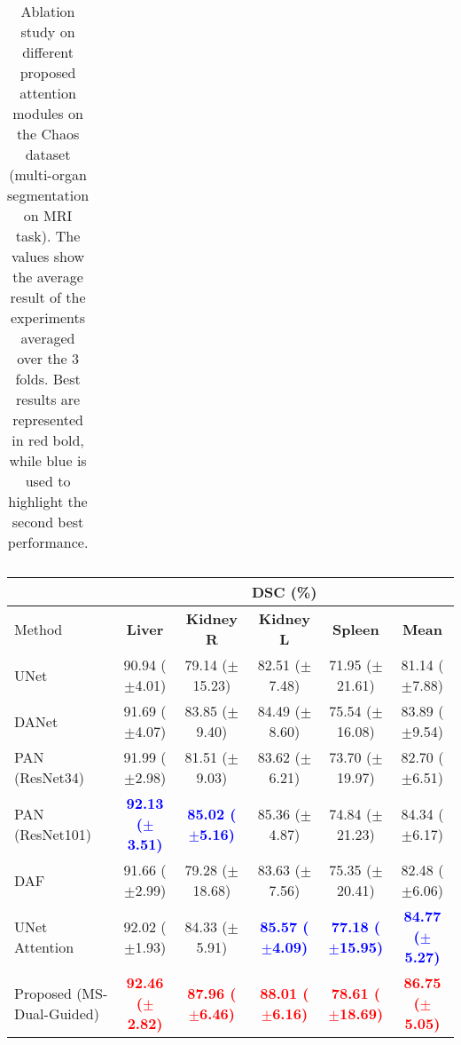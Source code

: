 \documentclass[journal]{IEEEtran}
\begin{document}
\begin{table*}[ht!]
\begin{tabular}{lcccc|c}
\midrule
\end{tabular}
\caption{Ablation study on different proposed attention modules on the Chaos dataset (multi-organ segmentation on MRI task). The values show the average result of the experiments averaged over the 3 folds. Best results are represented in red bold, while blue is used to highlight the second best performance.}
\label{table:metrics_ablation_supplemental}
\end{table*}

\begin{table*}[t!]
\centering
\scriptsize
\begin{tabular}{lcccc|c}\\
\toprule
 & \multicolumn{5}{c}{\textbf{DSC} (\%)}\\
 \midrule
Method & \textbf{Liver} & \textbf{Kidney R} & \textbf{Kidney L} & \textbf{Spleen} & \textbf{Mean}  \\
 \midrule
UNet \cite{ronneberger2015u}  & 90.94 ($\pm$4.01)  & 79.14 ($\pm$15.23) & 82.51 ($\pm$7.48) & 71.95 ($\pm$21.61) &  81.14 ($\pm$7.88) \\
DANet \cite{fu2018dual}  & 91.69  ($\pm$4.07) & 83.85 ($\pm$9.40)& 84.49 ($\pm$8.60) & 75.54 ($\pm$16.08)&  83.89 ($\pm$9.54)   \\
PAN (ResNet34) \cite{li2018pyramid}   & 91.99 ($\pm$2.98)  & 81.51 ($\pm$9.03) & 83.62 ($\pm$6.21) & 73.70 ($\pm$19.97) & 82.70 ($\pm$6.51) \\
PAN (ResNet101)\cite{li2018pyramid}   & \textcolor{blue}{\textbf{92.13 ($\pm$3.51)}}  & \textcolor{blue}{\textbf{85.02 ($\pm$5.16)}} & 85.36 ($\pm$4.87) & 74.84 ($\pm$21.23) & 84.34 ($\pm$6.17) \\
DAF \cite{wang18d}  &  91.66 ($\pm$2.99) & 79.28 ($\pm$18.68)& 83.63 ($\pm$7.56) &  75.35 ($\pm$20.41)&  82.48 ($\pm$6.06)   \\
UNet Attention \cite{schlemper2019attention}  &   92.02 ($\pm$1.93) & 84.33 ($\pm$5.91)&  \textcolor{blue}{\textbf{85.57 ($\pm$4.09)}} & \textcolor{blue}{\textbf{77.18 ($\pm$15.95)}} &  \textcolor{blue}{\textbf{84.77 ($\pm$5.27)}}   \\
Proposed (MS-Dual-Guided)  & \textcolor{red}{\textbf{92.46 ($\pm$2.82)}}  & \textcolor{red}{\textbf{87.96 ($\pm$6.46)}}& \textcolor{red}{\textbf{88.01 ($\pm$6.16)}}  & \textcolor{red}{\textbf{78.61 ($\pm$18.69)}} &  \textcolor{red}{\textbf{86.75 ($\pm$5.05)}}\\


\end{tabular}
\end{table*}
\end{document}
